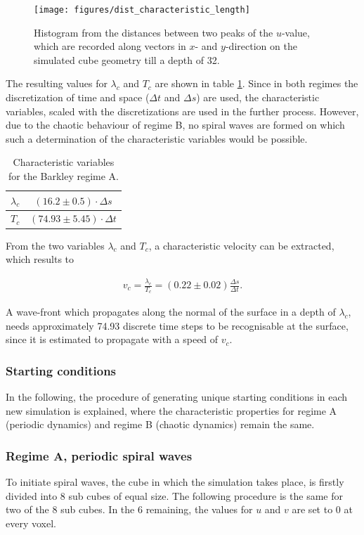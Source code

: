 \begin{figure}[ht]
    \center
    \texttt{[image: figures/dist\_characteristic\_length]}
	\caption{Histogram from the distances between two peaks of the $u$-value, which are recorded along vectors in $x$- and $y$-direction on the simulated cube geometry till a depth of 32.}
	\label{fig:dist_characteristic_length}
\end{figure}

The resulting values for $\lambda_c$ and $T_c$ are shown in table \ref{tab:characteristic}. Since in both regimes the discretization of time and space ($\Delta t$ and $\Delta s$) are used, the characteristic variables, scaled with the discretizations are used in the further process. However, due to the chaotic behaviour of regime B, no spiral waves are formed on which such a determination of the characteristic variables would be possible.

\begin{table}[h]
    \centering
    \caption{Characteristic variables for the Barkley regime A.}
    \begin{tabular}{|c|c|}
    \hline
    $\lambda_c$ & $(16.2\pm0.5)\cdot\Delta s$ \\ 
    \hline
    $T_c$ & $(74.93\pm5.45)\cdot\Delta t$ \\
    \hline
    \end{tabular}
    \label{tab:characteristic}
\end{table}

From the two variables $\lambda_c$ and $T_c$, a characteristic velocity can be extracted, which results to 

\begin{align}
    v_c=\frac{\lambda_c}{T_c}=(0.22\pm0.02)\frac{\Delta s}{\Delta t}.
\end{align}

A wave-front which propagates along the normal of the surface in a depth of $\lambda_c$, needs approximately 74.93 discrete time steps to be recognisable at the surface, since it is estimated to propagate with a speed of $v_c$.
\subsubsection*{Starting conditions}
In the following, the procedure of generating unique starting conditions in each new simulation is explained, where the characteristic properties for regime A (periodic dynamics) and regime B (chaotic dynamics) remain the same.

\subsubsection{Regime A, periodic spiral waves}
To initiate spiral waves, the cube in which the simulation takes place, is firstly divided into 8 sub cubes of equal size. The following procedure is the same for two of the 8 sub cubes. In the 6 remaining, the values for $u$ and $v$ are set to 0 at every voxel.

